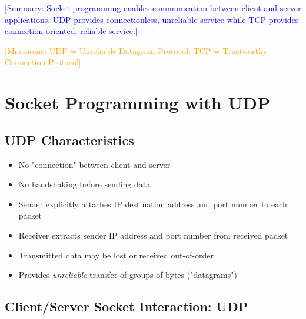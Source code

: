 \documentclass[12pt]{article}
\begin{document}
\textcolor{blue}{[Summary: Socket programming enables communication between client and server applications. UDP provides connectionless, unreliable service while TCP provides connection-oriented, reliable service.]}

\textcolor{orange}{[Mnemonic: UDP = Unreliable Datagram Protocol; TCP = Trustworthy Connection Protocol]}

\section{Socket Programming with UDP}

\subsection{UDP Characteristics}

\begin{itemize}
    \item No "connection" between client and server
    \item No handshaking before sending data
    \item Sender explicitly attaches IP destination address and port number to each packet
    \item Receiver extracts sender IP address and port number from received packet
    \item Transmitted data may be lost or received out-of-order
    \item Provides \textit{unreliable} transfer of groups of bytes ("datagrams")
\end{itemize}

\subsection{Client/Server Socket Interaction: UDP}
\end{document}
